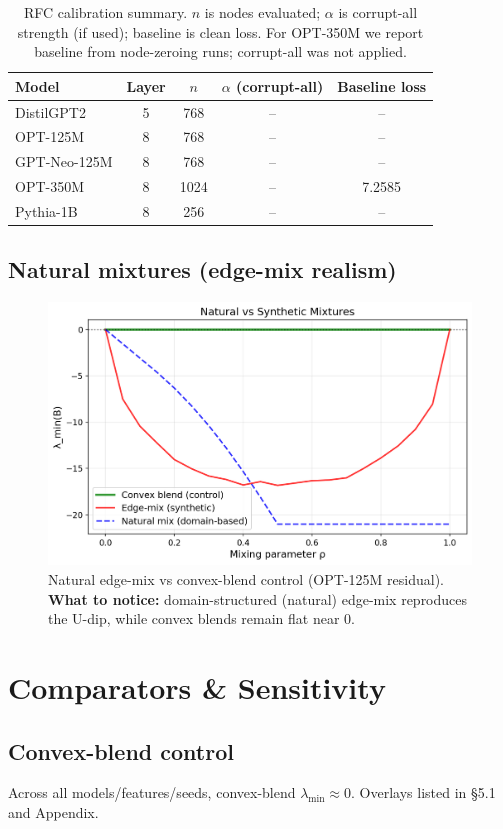 \documentclass[11pt]{article}
\newcommand{\1}{\mathbf{1}}
\begin{document}
\begin{table}[t]
\centering
\caption{RFC calibration summary. $n$ is nodes evaluated; $\alpha$ is corrupt-all strength (if used); baseline is clean loss. For OPT-350M we report baseline from node-zeroing runs; corrupt-all was not applied.}
\label{tab:rfc_calib}
\begin{tabular}{lcccc}
\toprule
Model & Layer & $n$ & $\alpha$ (corrupt-all) & Baseline loss \\
\midrule
DistilGPT2 & 5 & 768 & -- & -- \\
OPT-125M & 8 & 768 & -- & -- \\
GPT-Neo-125M & 8 & 768 & -- & -- \\
OPT-350M & 8 & 1024 & -- & 7.2585 \\
Pythia-1B & 8 & 256 & -- & -- \\
\bottomrule
\end{tabular}
\end{table}

\subsection{Natural mixtures (edge-mix realism)}
\begin{figure}[t]
\centering
\includegraphics[width=0.75\linewidth]{figs/natural_mix_overlay_facebook_opt-125m_residual_seed0.png}
\caption{Natural edge-mix vs convex-blend control (OPT-125M residual). \textbf{What to notice:} domain-structured (natural) edge-mix reproduces the U-dip, while convex blends remain flat near 0.}
\label{fig:natural_mix}
\end{figure}

\section{Comparators \& Sensitivity}
\subsection{Convex-blend control}
Across all models/features/seeds, convex-blend $\lambda_{\min}\!\approx\!0$. Overlays listed in \S5.1 and Appendix.
\end{document}
